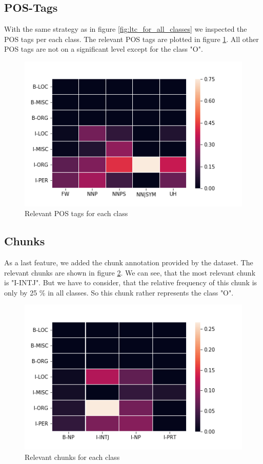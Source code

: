 \documentclass[noindent, nochapname]{tudexercise}
\begin{document}
		\subsection{POS-Tags}
			With the same strategy as in figure \ref{fig:ltc_for_all_classes} we inspected the POS tags per each class. The relevant POS tags are plotted in figure \ref{fig:pos_per_class}. All other POS tags are not on a significant level except for the class "O".
			
			\begin{figure}[h]
				\centering
				\includegraphics[scale=0.6]{img/pos_per_class.png}
				\caption{Relevant POS tags for each class}
				\label{fig:pos_per_class}
			\end{figure}
		
		\subsection{Chunks}
			As a last feature, we added the chunk annotation provided by the dataset. The relevant chunks are shown in figure \ref{fig:chunks_per_class}. We can see, that the most relevant chunk is "I-INTJ". But we have to consider, that the relative frequency of this chunk is only by 25 \% in all classes. So this chunk rather represents the class "O". 
			
			\begin{figure}[h]
				\centering
				\includegraphics[scale=0.6]{img/chunks_per_class.png}
				\caption{Relevant chunks for each class}
				\label{fig:chunks_per_class}
			\end{figure}
	
\end{document}
